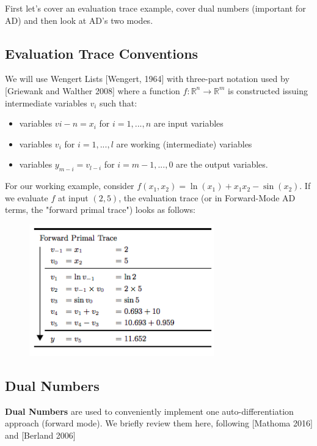 \documentclass[11pt]{article}
\theoremstyle{definition}
\theoremstyle{plain}
\renewcommand{\b}[1]{\mathbb{#1}}
\begin{document}
\noindent First let's cover an evaluation trace example, cover dual numbers (important for AD) 
and then look at AD's two modes.

\newpage

\subsection{Evaluation Trace Conventions}

We will use Wengert Lists [Wengert, 1964] with three-part notation used by 
[Griewank and Walther 2008] where a function $f: \b{R}^n \rightarrow \b{R}^m$ 
is constructed issuing intermediate variables $v_i$ such that:

\begin{itemize}
    \item variables $v{i-n} = x_i$ for $i=1,...,n$ are input variables
    \item variables $v_i$ for $i=1,...,l$ are working (intermediate) variables
    \item variables $y_{m-i} = v_{l-i}$ for $i=m-1,...,0$ are the output variables.
\end{itemize}

\noindent For our working example, consider $f(x_1,x_2) = \ln(x_1) + x_1x_2 - \sin(x_2)$. 
If we evaluate $f$ at input $(2,5)$, the evaluation trace (or in Forward-Mode AD terms,
the "forward primal trace") looks as follows:

\begin{figure}[H]
\includegraphics[width=8cm]{forward}
\centering
\end{figure}

\newpage

\subsection{Dual Numbers}

\noindent \textbf{Dual Numbers} are used to conveniently implement
one auto-differentiation approach (forward mode). We briefly review them
here, following [Mathoma 2016] and [Berland 2006]\\
\end{document}

